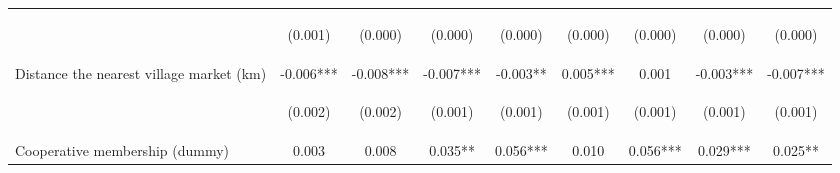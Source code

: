 \begin{center}
\begin{tabular}{lcccccccc}
\vspace{4pt} & \begin{footnotesize}(0.001)\end{footnotesize} & \begin{footnotesize}(0.000)\end{footnotesize} & \begin{footnotesize}(0.000)\end{footnotesize} & \begin{footnotesize}(0.000)\end{footnotesize} & \begin{footnotesize}(0.000)\end{footnotesize} & \begin{footnotesize}(0.000)\end{footnotesize} & \begin{footnotesize}(0.000)\end{footnotesize} & \begin{footnotesize}(0.000)\end{footnotesize} \\
Distance the nearest village market (km) & -0.006*** & -0.008*** & -0.007*** & -0.003** & 0.005*** & 0.001 & -0.003*** & -0.007*** \\
\vspace{4pt} & \begin{footnotesize}(0.002)\end{footnotesize} & \begin{footnotesize}(0.002)\end{footnotesize} & \begin{footnotesize}(0.001)\end{footnotesize} & \begin{footnotesize}(0.001)\end{footnotesize} & \begin{footnotesize}(0.001)\end{footnotesize} & \begin{footnotesize}(0.001)\end{footnotesize} & \begin{footnotesize}(0.001)\end{footnotesize} & \begin{footnotesize}(0.001)\end{footnotesize} \\
Cooperative membership (dummy) & 0.003 & 0.008 & 0.035** & 0.056*** & 0.010 & 0.056*** & 0.029*** & 0.025** \\

\end{tabular}
\end{center}
